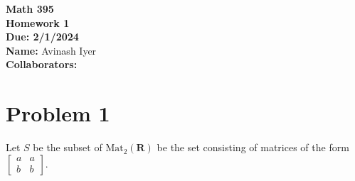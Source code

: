 \documentclass[10pt]{extarticle}
\title{}
\author{}
\date{}
\begin{document}
    \begin{center}
    {\bf \Large Math 395 \\[0.1in]Homework 1 \\[0.1in]
    Due: 2/1/2024}\\[.25in]
    {\bf Name:} {Avinash Iyer}\\[0.15in]
    {\bf Collaborators:} {\underline{\hspace*{4.5in}}} \\
    \end{center}
  \section{Problem 1}%
  Let $S$ be the subset of $\text{Mat}_{2}(\mathbf{R})$ be the set consisting of matrices of the form $ \begin{bmatrix}a&a\\b&b\end{bmatrix} $.
\end{document}
